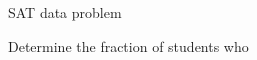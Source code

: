 \begin{pa} \label{PA:6.6}  SAT data problem
\ba
	\item Determine the fraction of students who 
\ea
\end{pa} 
\afterpa